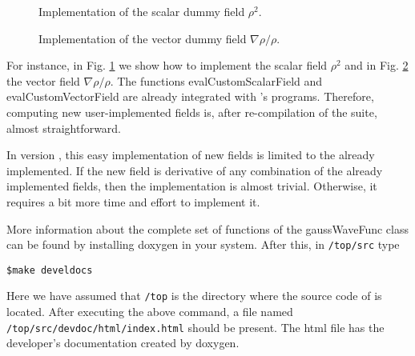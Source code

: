 \begin{figure}

\caption{Implementation of the scalar dummy field $\rho^2$.}
\label{fig:codecustfld}
\end{figure}

\begin{figure}

\caption{Implementation of the vector dummy field
$\nabla\rho/\rho$.}
\label{fig:codecustvecfld}
\end{figure}

For instance, in Fig. \ref{fig:codecustfld} we show how to implement the scalar field $\rho^2$
and in Fig. \ref{fig:codecustvecfld} the vector field $\nabla\rho/\rho$. The functions evalCustomScalarField and evalCustomVectorField
are already integrated with \DTK's programs. Therefore, computing new user-implemented fields
is, after re-compilation of the suite, almost straightforward. 

In version \dtkversion, this easy implementation of new fields is limited to the
already implemented. 
If the new field is derivative of any combination of the already implemented fields,
then the implementation is almost trivial. Otherwise, it requires a bit more time
and effort to
implement it.

More information about the complete set of functions of the gaussWaveFunc class can be found by
installing doxygen in your system. After this, in \texttt{/top/src} type
\begin{lstlisting}
$make develdocs
\end{lstlisting}
Here we have assumed that \texttt{/top} is the directory where the source code of \DTK{} is 
located. After executing the above command, a file named \texttt{/top/src/devdoc/html/in\-dex.\-html}
should be present. The html file has the developer's documentation created by doxygen.

